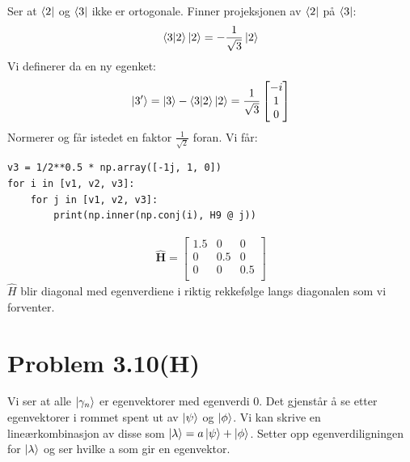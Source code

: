 \documentclass[norsk,a4paper,12pt]{article}
\begin{document}
	Ser at $\bra{2}$ og $\bra{3}$ ikke er ortogonale. Finner projeksjonen av $\bra{2}$ på $\bra{3}$:
	\begin{equation*}
	\begin{aligned}
	\bra{3}\ket{2} \ket{2} = -\frac{1}{\sqrt{3}} \ket{2}
	\end{aligned}
	\end{equation*}
	Vi definerer da en ny egenket:
	\begin{equation*}
	\ket{3'} = \ket{3} - \bra{3}\ket{2} \ket{2} = \frac{1}{\sqrt{3}} \begin{bmatrix}
	-i \\
	1 \\
	0 \\
	\end{bmatrix}
	\end{equation*}
	Normerer og får istedet en faktor $\frac{1}{\sqrt{2}}$ foran. Vi får:
	\begin{verbatim}
v3 = 1/2**0.5 * np.array([-1j, 1, 0])
for i in [v1, v2, v3]:
    for j in [v1, v2, v3]:
        print(np.inner(np.conj(i), H9 @ j))
	\end{verbatim}
	\begin{equation*}
	\begin{aligned}
	\mathbf{\hat{H}} = \begin{bmatrix}
	1.5 & 0 & 0 \\
	0 & 0.5 & 0 \\
	0 & 0 & 0.5 \\
	\end{bmatrix}
	\end{aligned}
	\end{equation*}
	$\hat{H}$ blir diagonal med egenverdiene i riktig rekkefølge langs diagonalen som vi forventer.
	
\section*{Problem 3.10(H)}

	Vi ser at alle $\ket{\gamma_n}$ er egenvektorer med egenverdi 0. Det gjenstår å se etter egenvektorer i rommet spent ut av $\ket{\psi}$ og $\ket{\phi}$. Vi kan skrive en lineærkombinasjon av disse som $\ket{\lambda} = a\ket{\psi} + \ket{\phi}$. Setter opp egenverdiligningen for $\ket{\lambda}$ og ser hvilke a som gir en egenvektor.
	
\end{document}
